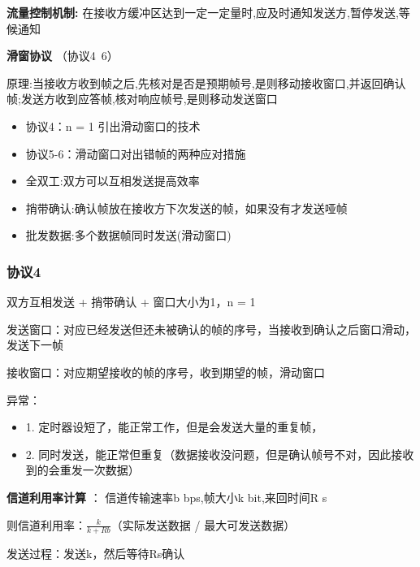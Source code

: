 \documentclass[UTF8,a4paper]{ctexart}
\begin{document}
\textbf{流量控制机制:} 在接收方缓冲区达到一定一定量时,应及时通知发送方,暂停发送,等候通知

\textbf{滑窗协议} （协议4~6）

原理:当接收方收到帧之后,先核对是否是预期帧号,是则移动接收窗口,并返回确认帧;发送方收到应答帧,核对响应帧号,是则移动发送窗口
\begin{itemize}
  \item 协议4：n = 1 引出滑动窗口的技术
  \item 协议5-6：滑动窗口对出错帧的两种应对措施
\end{itemize}

\begin{itemize}
  \item 全双工:双方可以互相发送提高效率
  \item 捎带确认:确认帧放在接收方下次发送的帧，如果没有才发送哑帧
  \item 批发数据:多个数据帧同时发送(滑动窗口)
\end{itemize}

\subsubsection{协议4}
双方互相发送 + 捎带确认 + 窗口大小为1，n = 1

发送窗口：对应已经发送但还未被确认的帧的序号，当接收到确认之后窗口滑动，发送下一帧

接收窗口：对应期望接收的帧的序号，收到期望的帧，滑动窗口


异常：
\begin{itemize}
  \item 1. 定时器设短了，能正常工作，但是会发送大量的重复帧，
  \item 2. 同时发送，能正常但重复（数据接收没问题，但是确认帧号不对，因此接收到的会重发一次数据）
\end{itemize}

\textbf{信道利用率计算} ：
信道传输速率b bps,帧大小k bit,来回时间R s

则信道利用率：$\frac{k}{k + Rb}$（实际发送数据 / 最大可发送数据）

发送过程：发送k，然后等待Rs确认
\end{document}
